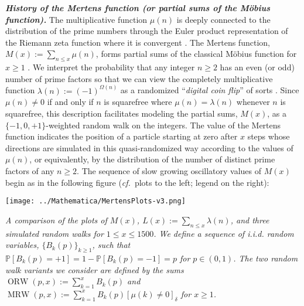 \documentclass[10pt,reqno,letterpaper]{article}
\theoremstyle{plain}
\numberwithin{theorem}{section}
\theoremstyle{definition}
\newcommand{\cf}[0]{\emph{cf.}\ }
\newcommand{\Iverson}[1]{\ensuremath{\left[#1\right]_{\delta}}}
\newcommand{\seqnum}[1]{\href{http://oeis.org/#1}{\color{Gray!50!Black}{\underline{#1}}}}
\begin{document}
\noindent
{\small \textbf{\emph{History of the Mertens function (or partial sums of the M\"obius function).}}} 
The multiplicative function $\mu(n)$ is deeply connected to the 
distribution of the prime numbers through the Euler product representation of the Riemann zeta 
function where it is convergent \cite{APOSTOLANUMT}. 
The Mertens function, $M(x) := \sum_{n \leq x} \mu(n)$, forms partial sums 
of the classical M\"obius function for $x \geq 1$ \cite[\seqnum{A008683}; \seqnum{A002321}]{OEIS}.
We interpret the probability that any integer $n \geq 2$ has an even (or odd) number of prime 
factors so that we can view the completely multiplicative function $\lambda(n) := (-1)^{\Omega(n)}$ as a 
randomized ``\emph{digital coin flip}'' of sorts 
\cite[\seqnum{A008836}; \seqnum{A002819}]{OEIS}. Since $\mu(n) \neq 0$ if and only if 
$n$ is squarefree where $\mu(n) = \lambda(n)$ whenever 
$n$ is squarefree, this description facilitates modeling the 
partial sums, $M(x)$, as a $\{-1,0,+1\}$-weighted random walk on the integers. 
The value of the Mertens function indicates the position of a particle starting at zero 
after $x$ steps whose directions are simulated in this quasi-randomized way according to 
the values of $\mu(n)$, or equivalently, by the distribution of the number of distinct prime factors of 
any $n \geq 2$. 
The sequence of slow growing oscillatory values of $M(x)$ begin 
as in the following figure (\cf plots to the left; legend on the right): \\[0.4mm] 
\begin{minipage}{0.48\textwidth}
     \texttt{[image: ../Mathematica/MertensPlots-v3.png]}
\end{minipage} \hfill
\begin{minipage}{0.485\textwidth}
\begin{tcolorbox}[width=\linewidth,halign=justify,boxsep=0mm,arc=2.25mm,colframe=gray!49]
\em\small 
A comparison of the plots of $M(x)$, $L(x) := \sum_{n \leq x} \lambda(n)$, and 
three simulated random walks for $1 \leq x \leq 1500$. 
We define a sequence of i.i.d. random variables, $\{B_k(p)\}_{k \geq 1}$, such that 
$\mathbb{P}[B_k(p) = +1] = 1 - \mathbb{P}[B_k(p) = -1] = p$ for $p \in (0, 1)$. 
The two random walk variants we consider are defined by the sums 
$\operatorname{ORW}(p, x) := \sum_{k=1}^{x} B_k(p)$ and 
$\operatorname{MRW}(p, x) := \sum_{k=1}^{x} B_k(p) \Iverson{\mu(k) \neq 0}$ for $x \geq 1$. 
\end{tcolorbox}
\end{minipage}
\end{document}
